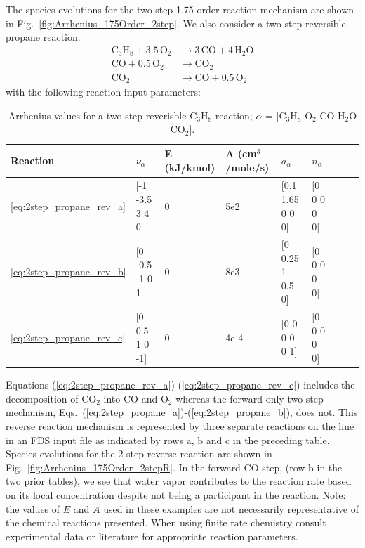 \documentclass[11pt]{book}
\begin{document}
The species evolutions for the two-step 1.75 order reaction mechanism are shown in Fig.~\ref{fig:Arrhenius_175Order_2step}. We also consider a two-step reversible propane reaction:
\begin{subequations}
\begin{align}
\label{eq:2step_propane_rev_a}
\mathrm{C_3H_8+3.5 \, O_2} &\rightarrow \mathrm{3 \, CO+4 \, H_2O} \\
\label{eq:2step_propane_rev_b}
\mathrm{CO + 0.5 \, O_2} &\rightarrow \mathrm{CO_2} \\
\label{eq:2step_propane_rev_c}
\mathrm{CO_2} &\rightarrow \mathrm{CO + 0.5 \, O_2}
\end{align}
\end{subequations}
with the following reaction input parameters:
\begin{table}[ht]
\begin{center}
\caption[Arrhenius values for a two-step reversible C$_3$H$_8$ reaction]{Arrhenius values for a two-step reverisble C$_3$H$_8$ reaction; $\alpha$ = [$\mathrm{C_3H_8}$ $\mathrm{O_2}$ $\mathrm{CO}$ $\mathrm{H_2O}$ $\mathrm{CO_2}$].}
\label{two_step_rev_c3h8}
\begin{tabular}{|l|l|l|l|l|l|l|l|l|}
\hline Reaction & $\nu_{\alpha}$ & E (kJ/kmol) & A (cm$^3$/mole/s) & $a_{\alpha}$ & $n_{\alpha}$  \\ \hline \hline
\ref{eq:2step_propane_rev_a} & [-1 -3.5 3 4 0] & 0 & 5e2  & [0.1 1.65 0 0 0] & [0 0 0 0 0] \\ \hline
\ref{eq:2step_propane_rev_b} & [0 -0.5 -1 0 1] & 0 & 8e3  & [0 0.25 1 0.5 0] & [0 0 0 0 0] \\ \hline
\ref{eq:2step_propane_rev_c} & [0 0.5 1 0 -1]  & 0 & 4e-4 & [0 0 0 0 0 1]    & [0 0 0 0 0] \\ \hline
\end{tabular}
\end{center}
\end{table}
Equations (\ref{eq:2step_propane_rev_a})-(\ref{eq:2step_propane_rev_c}) includes the decomposition of $\mathrm{CO_2}$ into $\mathrm{CO}$ and $\mathrm{O_2}$ whereas the forward-only two-step mechanism, Eqs.~(\ref{eq:2step_propane_a})-(\ref{eq:2step_propane_b}), does not. This reverse reaction mechanism is represented by three separate reactions on the  line in an FDS input file as indicated by rows $\mathrm{a}$, $\mathrm{b}$ and $\mathrm{c}$ in the preceding table. Species evolutions for the 2 step reverse reaction are shown in Fig.~\ref{fig:Arrhenius_175Order_2stepR}. In the forward CO step, (row $\mathrm{b}$ in the two prior tables), we see that water vapor contributes to the reaction rate based on its local concentration despite not being a participant in the reaction.
\vskip8pt
Note: the values of $E$ and $A$ used in these examples are not necessarily representative of the chemical reactions presented. When using finite rate chemistry consult experimental data or literature for appropriate reaction parameters.
\end{document}
